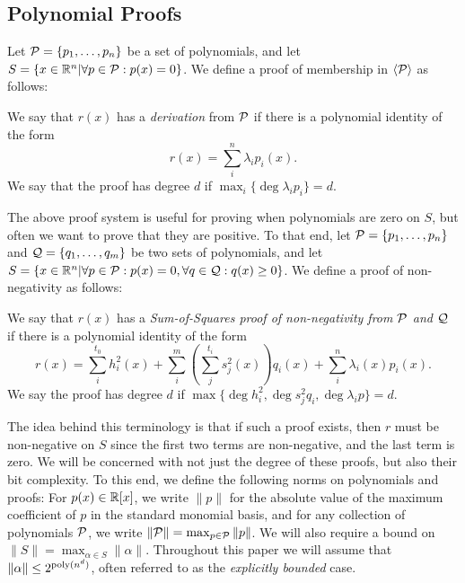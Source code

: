 \subsection{Polynomial Proofs}
Let $\mathcal P = \{p_1,\dots,p_n\}$ be a set of polynomials, and let $S = \{x \in \mathbb R^n | \forall p \in \mathcal P: p(x) = 0\}$. We define a proof of membership in $\langle \mathcal P\rangle$ as follows:
\begin{definition}
We say that $r(x)$ has a \emph{derivation} from $\mathcal P$ if there is a polynomial identity of the form
\[r(x) = \sum_{i}^n \lambda_i p_i(x).\]
We say that the proof has degree $d$ if $\max_i \{\deg \lambda_i p_i\} = d$.
\end{definition}

The above proof system is useful for proving when polynomials are zero on $S$, but often we want to prove that they are positive. To that end, let $\mathcal P = \{p_1,\dots,p_n\}$ and $\mathcal Q = \{q_1,\dots,q_m\}$ be two sets of polynomials, and let $S = \{x \in \mathbb R^n | \forall p \in \mathcal P: p(x) = 0, \forall q \in \mathcal Q: q(x) \geq 0\}$. We define a proof of non-negativity as follows:
\begin{definition}
 We say that $r(x)$ has a \emph{Sum-of-Squares proof of non-negativity from $\mathcal P$ and $\mathcal Q$} if there is a polynomial identity of the form
\[r(x) = \sum_{i}^{t_0} h_i^2(x) + \sum_{i}^m \left(\sum_{j}^{t_i} s_j^2(x)\right)q_i(x) + \sum_{i}^n \lambda_i(x) p_i(x).\]
We say the proof has degree $d$ if $\max \{\deg h_i^2, \deg s_j^2q_i, \deg \lambda_i p\} = d$.
\end{definition}
The idea behind this terminology is that if such a proof exists, then $r$ must be non-negative on $S$ since the first two terms are non-negative, and the last term is zero. We will be concerned with not just the degree of these proofs, but also their bit complexity. To this end, we define the following norms on polynomials and proofs: For $p(x) \in \mathbb R[x]$, we write $\|p\|$ for the absolute value of the maximum coefficient of $p$ in the standard monomial basis, and for any collection of polynomials $\mathcal P$, we write $\|\mathcal P\| = \max_{p \in \mathcal P} \|p\|$. We will also require a bound on $\|S\| = \max_{\alpha \in S} \|\alpha\|$. Throughout this paper we will assume that $\|\alpha\| \leq 2^{\operatorname{poly}(n^d)}$, often referred to as the \emph{explicitly bounded} case. 


